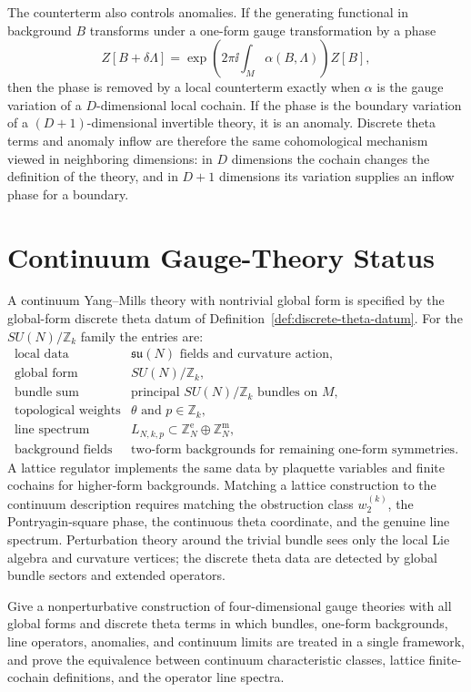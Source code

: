 The counterterm also controls anomalies.  If the generating functional in
background \(B\) transforms under a one-form gauge transformation by a phase
\[
  Z[B+\delta\Lambda]
  =
  \exp\left(2\pi\ii\int_M \alpha(B,\Lambda)\right)Z[B],
\]
then the phase is removed by a local counterterm exactly when
\(\alpha\) is the gauge variation of a \(D\)-dimensional local cochain.  If
the phase is the boundary variation of a \((D+1)\)-dimensional invertible
theory, it is an anomaly.  Discrete theta terms and anomaly inflow are
therefore the same cohomological mechanism viewed in neighboring dimensions:
in \(D\) dimensions the cochain changes the definition of the theory, and in
\(D+1\) dimensions its variation supplies an inflow phase for a boundary.

\section{Continuum Gauge-Theory Status}

A continuum Yang--Mills theory with nontrivial global form is specified by the
global-form discrete theta datum of Definition~\ref{def:discrete-theta-datum}.
For the \(SU(N)/\mathbb Z_k\) family the entries are:
\[
\begin{array}{ll}
  \text{local data} &
  \mathfrak{su}(N)\text{ fields and curvature action},\\[1mm]
  \text{global form} &
  SU(N)/\mathbb Z_k,\\[1mm]
  \text{bundle sum} &
  \text{principal }SU(N)/\mathbb Z_k\text{ bundles on }M,\\[1mm]
  \text{topological weights} &
  \theta\text{ and }p\in\mathbb Z_k,\\[1mm]
  \text{line spectrum} &
  L_{N,k,p}\subset\mathbb Z_N^{\mathrm e}\oplus\mathbb Z_N^{\mathrm m},\\[1mm]
  \text{background fields} &
  \text{two-form backgrounds for remaining one-form symmetries}.
\end{array}
\]
A lattice regulator implements the same data by plaquette variables and
finite cochains for higher-form backgrounds.  Matching a lattice construction
to the continuum description requires matching the obstruction class
\(w_2^{(k)}\), the Pontryagin-square phase, the continuous theta coordinate,
and the genuine line spectrum.  Perturbation theory around the trivial bundle
sees only the local Lie algebra and curvature vertices; the discrete theta
data are detected by global bundle sectors and extended operators.

\begin{openproblem}
\label{op:discrete-theta-continuum-qft}
Give a nonperturbative construction of four-dimensional gauge theories with
all global forms and discrete theta terms in which bundles, one-form
backgrounds, line operators, anomalies, and continuum limits are treated in a
single framework, and prove the equivalence between continuum characteristic
classes, lattice finite-cochain definitions, and the operator line spectra.
\end{openproblem}

